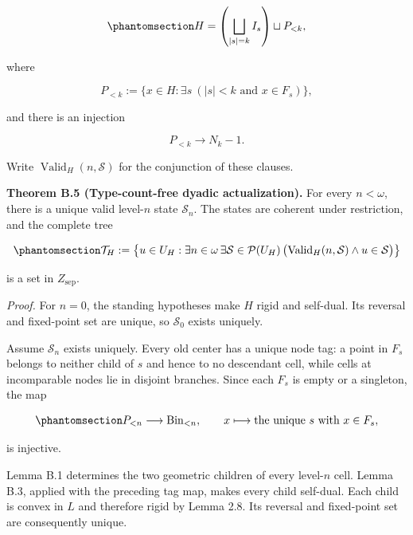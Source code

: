 \documentclass[
  english,
  11pt,
  reqno]{amsart}
\begin{document}
\begin{equation}\protect\phantomsection\label{eq:typefree-level-partition}{
   H
   =
   \left(\bigsqcup_{|s|=k}I_s\right)
   \sqcup
   P_{<k},
}\end{equation}

where

\[
   P_{<k}
   :=
   \{x\in H:\exists s\ (|s|<k\text{ and }x\in F_s)\},
\]

and there is an injection

\[
   P_{<k}\longrightarrow N_k-1.
\]

Write \(\operatorname{Valid}_H(n,\mathcal S)\) for the conjunction of
these clauses.

\protect{}\label{thm:b-5-tree-actualization}

\textbf{Theorem B.5 (Type-count-free dyadic actualization).} For every
\(n<\omega\), there is a unique valid level-\(n\) state
\(\mathcal S_n\). The states are coherent under restriction, and the
complete tree

\begin{equation}\protect\phantomsection\label{eq:typefree-complete-tree}{
\mathcal T_H
:=
\left\{
 u\in U_H:
 \exists n\in\omega\,
 \exists\mathcal S\in\mathcal P(U_H)\,
 \bigl(
  \operatorname{Valid}_H(n,\mathcal S)
  \wedge
  u\in\mathcal S
 \bigr)
\right\}
}\end{equation}

is a set in \(Z_{\mathrm{sep}}\).

\emph{Proof.} For \(n=0\), the standing hypotheses make \(H\) rigid and
self-dual. Its reversal and fixed-point set are unique, so
\(\mathcal S_0\) exists uniquely.

Assume \(\mathcal S_n\) exists uniquely. Every old center has a unique
node tag: a point in \(F_s\) belongs to neither child of \(s\) and hence
to no descendant cell, while cells at incomparable nodes lie in disjoint
branches. Since each \(F_s\) is empty or a singleton, the map

\begin{equation}\protect\phantomsection\label{eq:typefree-old-center-tags}{
P_{<n}\longrightarrow\operatorname{Bin}_{<n},
\qquad
x\longmapsto\text{the unique }s\text{ with }x\in F_s,
}\end{equation}

is injective.

Lemma B.1 determines the two geometric children of every level-\(n\)
cell. Lemma B.3, applied with the preceding tag map, makes every child
self-dual. Each child is convex in \(L\) and therefore rigid by Lemma
2.8. Its reversal and fixed-point set are consequently unique.
\end{document}
